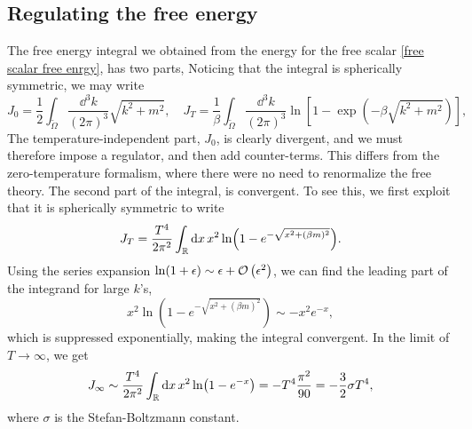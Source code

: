 \subsection*{Regulating the free energy}
The free energy integral we obtained from the energy for the free scalar \autoref{free scalar free enrgy}, has two parts,
Noticing that the integral is spherically symmetric, we may write
\begin{equation}
    J_0 = \frac{1}{2} \int_{\tilde \Omega} \frac{\dd^3 k}{(2 \pi)^3} \sqrt{k^2 + m^2}, \quad
    J_T = \frac{1}{\beta} \int_{\tilde \Omega} \frac{\dd^3 k}{(2 \pi)^3} 
    \ln\left[1 - \exp(- \beta \sqrt{k^2 + m^2})\right], 
\end{equation}
The temperature-independent part, $J_0$, is clearly divergent, and we must therefore impose a regulator, and then add counter-terms.
This differs from the zero-temperature formalism, where there were no need to renormalize the free theory.
The second part of the integral, is convergent. 
To see this, we first exploit that it is spherically symmetric to write
\begin{equation}
    J_T = \frac{T^4}{2 \pi^2}\int_{\mathbb{R}} \dd x \, x^2  \ln(1 - e^{-\sqrt{x^2 + (\beta m)^2}}).
\end{equation}
Using the series expansion $\ln(1 + \epsilon) \sim \epsilon + \mathcal{O}\left(\epsilon^{2}\right)$, we can find the leading part of the  integrand for large $k$'s, 
\begin{equation}
    x^2 \ln(1 - e^{-\sqrt{x^2 + (\beta m)^2}}) \sim - x^2 e^{-x}, 
\end{equation}
which is suppressed exponentially, making the integral convergent.
In the limit of $T \rightarrow \infty$, we get
\begin{equation}
    J_\infty \sim \frac{T^4}{2 \pi^2} \int_{\mathbb{R}} \dd x \, x^2 \ln(1 - e^{-x})
    = - T^4 \frac{\pi^2}{90} = -\frac{3}{2} \sigma T^4,
\end{equation}
where $\sigma$ is the Stefan-Boltzmann constant. 

